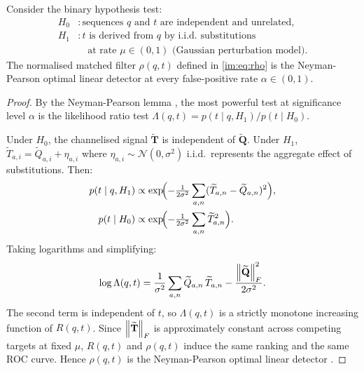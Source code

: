 \begin{theorem}
\label{im:thm:matched_filter}
Consider the binary hypothesis test:
\begin{align*}
  H_0 &: \text{sequences } q \text{ and } t \text{ are independent and unrelated,}\\
  H_1 &: t \text{ is derived from } q \text{ by i.i.d.\ substitutions}\\
      &\quad\text{at rate } \mu \in (0,1) \text{ (Gaussian perturbation model).}
\end{align*}
The normalised matched filter $\rho(q,t)$ defined in \eqref{im:eq:rho} is the
Neyman-Pearson optimal linear detector at every false-positive rate
$\alpha \in (0,1)$.
\end{theorem}

\begin{proof}
By the Neyman-Pearson lemma \citep{neyman1933}, the most powerful test at
significance level $\alpha$ is the likelihood ratio test
$\Lambda(q,t) = p(t \mid q, H_1) / p(t \mid H_0)$.

Under $H_0$, the channelised signal $\widetilde{\mathbf{T}}$ is independent
of $\widetilde{\mathbf{Q}}$. Under $H_1$,
$\widetilde{T}_{a,i} = \widetilde{Q}_{a,i} + \eta_{a,i}$ where
$\eta_{a,i} \sim \mathcal{N}(0,\sigma^2)$ i.i.d.\ represents the aggregate
effect of substitutions. Then:
\begin{align}
  p(t \mid q, H_1)
    &\propto \exp\!\Bigl(-\tfrac{1}{2\sigma^2}
      \sum_{a,n}(\widetilde{T}_{a,n}-\widetilde{Q}_{a,n})^2\Bigr),
      \nonumber\\
  p(t \mid H_0)
    &\propto \exp\!\Bigl(-\tfrac{1}{2\sigma^2}
      \sum_{a,n}\widetilde{T}_{a,n}^2\Bigr).
  \label{im:eq:likelihoods}
\end{align}
Taking logarithms and simplifying:
\begin{equation}
  \log\Lambda(q,t)
  = \frac{1}{\sigma^2}\sum_{a,n}\widetilde{Q}_{a,n}\,\widetilde{T}_{a,n}
    - \frac{\norm{\widetilde{\mathbf{Q}}}_F^2}{2\sigma^2}.
  \label{im:eq:log_lr}
\end{equation}
The second term is independent of $t$, so $\Lambda(q,t)$ is a strictly
monotone increasing function of $R(q,t)$. Since
$\norm{\widetilde{\mathbf{T}}}_F$ is approximately constant across competing
targets at fixed $\mu$, $R(q,t)$ and $\rho(q,t)$ induce the same ranking
and the same ROC curve. Hence $\rho(q,t)$ is the Neyman-Pearson optimal
linear detector \citep{kay1998,vantrees2001,turin1960}.
\end{proof}

